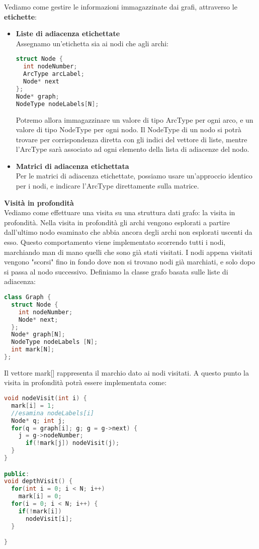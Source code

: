 \documentclass[a4paper,12pt]{article}
\begin{document}
Vediamo come gestire le informazioni immagazzinate dai grafi, attraverso le \textbf{etichette}:
\begin{itemize}
  \item \textbf{Liste di adiacenza etichettate} \\
    Assegnamo un'etichetta sia ai nodi che agli archi:
    \begin{lstlisting}[language=C++]
struct Node {
  int nodeNumber;
  ArcType arcLabel;
  Node* next
};
Node* graph;
NodeType nodeLabels[N];
\end{lstlisting}
Potremo allora immagazzinare un valore di tipo ArcType per ogni arco, e un valore di tipo NodeType per ogni nodo. Il NodeType di un nodo
si potrà trovare per corrispondenza diretta con gli indici del vettore di liste, mentre l'ArcType sarà associato ad ogni elemento della lista
di adiacenze del nodo.
\item \textbf{Matrici di adiacenza etichettata} \\
  Per le matrici di adiacenza etichettate, possiamo usare un'approccio identico per i nodi, e indicare l'ArcType direttamente sulla matrice. 
\end{itemize}
\par\smallskip
\textbf{Visità in profondità} \\
Vediamo come effettuare una visita su una struttura dati grafo: la visita in profondità. Nella visita in profondità
gli archi vengono esplorati a partire dall'ultimo nodo esaminato che abbia ancora degli archi non esplorati uscenti da esso.
Questo comportamento viene implementato scorrendo tutti i nodi, marchiando man di mano quelli che sono già stati visitati. I nodi appena visitati
vengono "scorsi" fino in fondo dove non si trovano nodi già marchiati, e solo dopo si passa al nodo successivo.
Definiamo la classe grafo basata sulle liste di adiacenza:
\begin{lstlisting}[language=C++]
class Graph {
  struct Node {
    int nodeNumber;
    Node* next;
  };
  Node* graph[N];
  NodeType nodeLabels [N];
  int mark[N];
};
\end{lstlisting}
Il vettore mark[] rappresenta il marchio dato ai nodi visitati. A questo punto la visita in profondità potrà essere implementata come:
\begin{lstlisting}[language=C++]
void nodeVisit(int i) {
  mark[i] = 1;
  //esamina nodeLabels[i]
  Node* q; int j;
  for(q = graph[i]; g; g = g->next) {
    j = g->nodeNumber;
      if(!mark[j]) nodeVisit(j);
  }
}

public:
void depthVisit() {
  for(int i = 0; i < N; i++)
    mark[i] = 0;
  for(i = 0; i < N; i++) {
    if(!mark[i])
      nodeVisit[i];
  }

}
\end{lstlisting}
\end{document}
